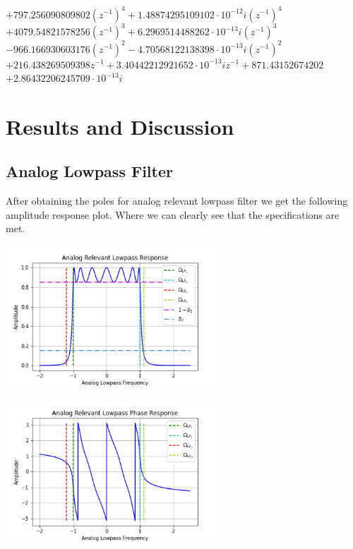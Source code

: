 \documentclass{scrartcl}
\begin{document}
\begin{center}
    $ + 797.256090809802 \left(z^{-1}\right)^{4} + 1.48874295109102 \cdot 10^{-12} i \left(z^{-1}\right)^{4}$ \\ 
    $ + 4079.54821578256 \left(z^{-1}\right)^{3} + 6.2969514488262 \cdot 10^{-13} i \left(z^{-1}\right)^{3}$ \\ 
    $ - 966.166930603176 \left(z^{-1}\right)^{2} - 4.70568122138398 \cdot 10^{-13} i \left(z^{-1}\right)^{2}$ \\ 
    $ + 216.438269509398 z^{-1} + 3.40442212921652 \cdot 10^{-13} i z^{-1} + 871.43152674202$ \\ 
    $ + 2.86432206245709 \cdot 10^{-13} i$
    
\end{center}

\newpage


\section{Results and Discussion} 

\subsection{Analog Lowpass Filter}

After obtaining the poles for analog relevant lowpass filter we get the following amplitude response plot. Where we can clearly see that the specifications are met.
\vspace{0.5cm}
\begin{center}
    \includegraphics[width=0.6\textwidth]{Graphics/Lowpass.png}\par\vspace{0.5cm}    
\end{center}
\begin{center}
    \includegraphics[width=0.6\textwidth]{Graphics/LpPhase.png}\par\vspace{0.2cm}    
\end{center}
\end{document}
